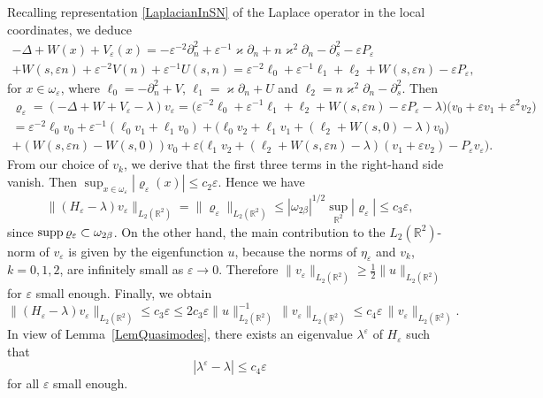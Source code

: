 \documentclass[reqno]{amsart}
\theoremstyle{plain}
\numberwithin{equation}{section}
\newcommand{\supp}{\mathop{\rm supp}}
\renewcommand{\kappa}{\varkappa}
\newcommand{\Real}{\mathbb R}
\newcommand{\eps}{\varepsilon}
\renewcommand{\leq}{\leqslant}
\renewcommand{\geq}{\geqslant}
\begin{document}
Recalling representation \eqref{LaplacianInSN} of the Laplace operator in the local coordinates, we deduce
\begin{multline*}
-\Delta+W(x)+V_\eps(x)
=-\eps^{-2}\partial^2_n+\eps^{-1}\kappa\partial_n
+n\kappa^2\partial_n-\partial^2_s-\eps P_\eps\\
+W(s,\eps n)+ \eps^{-2}V(n)+\eps^{-1}U(s,n) =\eps^{-2}\ell_0+\eps^{-1}\ell_1+\ell_2+W(s,\eps n)-\eps P_\eps,
\end{multline*}
for $x\in \omega_\eps$, where $\ell_0=-\partial^2_n+V$, $\ell_1=\kappa\partial_n
+U$ and $\ell_2=n\kappa^2\partial_n-\partial^2_s$. Then
\begin{multline}\label{RhoEpsOmegaEps}
  \varrho_\eps=(-\Delta+W+V_\eps -\lambda)v_\eps
  =\big(\eps^{-2}\ell_0+\eps^{-1}\ell_1+\ell_2+W(s,\eps n)-\eps P_\eps-\lambda\big)\big(v_0+\eps v_1+\eps^2 v_2\big)\\
  =\eps^{-2}\ell_0v_0+\eps^{-1}(\ell_0v_1+\ell_1v_0)+\big(\ell_0v_2+\ell_1v_1
  +(\ell_2+W(s,0)-\lambda)v_0\big)
  \\
  +(W(s,\eps n)-W(s,0))v_0+\eps \big(\ell_1v_2+(\ell_2+W(s,\eps n)-\lambda)
  (v_1+\eps v_2) - P_\eps v_\eps\big).
\end{multline}
From our choice of $v_k$, we derive that the first three terms in the right-hand side vanish. Then $\sup_{x\in\omega_\eps}|\varrho_\eps(x)|\leq c_2\eps$. Hence we have
\begin{equation*}
  \|(H_\eps-\lambda)v_\eps\|_{L_2(\Real^2)}=
  \|\varrho_\eps\|_{L_2(\Real^2)}\leq |\omega_{2\beta}|^{1/2}\sup_{\Real^2}|\varrho_\eps|\leq c_3 \eps,
\end{equation*}
since $\supp \varrho_\eps\subset \omega_{2\beta}$.
On the other hand, the main contribution  to the $L_2(\Real^2)$-norm of $v_\eps$ is given by the eigenfunction $u$, because the norms of $\eta_\eps$ and $v_k$, $k=0,1,2$, are infinitely small  as $\eps\to 0$. Therefore $\|v_\eps\|_{L_2(\Real^2)}\geq \frac{1}{2}\|u\|_{L_2(\Real^2)}$ for $\eps$ small enough.
 Finally, we obtain
\begin{equation*}
 \|(H_\eps-\lambda)v_\eps\|_{L_2(\Real^2)}\leq c_3 \eps
 \leq 2c_3 \eps\|u\|_{L_2(\Real^2)}^{-1}\,\|v_\eps\|_{L_2(\Real^2)}\leq c_4 \eps\,\|v_\eps\|_{L_2(\Real^2)}.
\end{equation*}
In view of Lemma~\ref{LemQuasimodes}, there exists an eigenvalue $\lambda^\eps$ of $H_\eps$ such that
\begin{equation*}
  |\lambda^\eps-\lambda|\leq c_4\eps
\end{equation*}
for all $\eps$  small enough.
\end{document}
